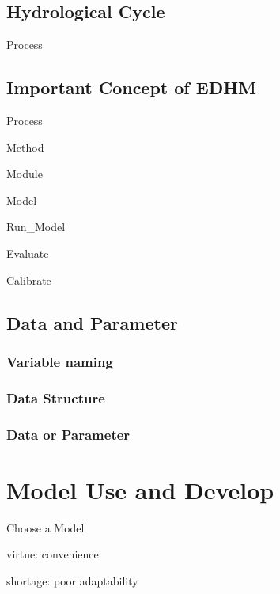 \documentclass[
]{book}
\begin{document}
\hypertarget{hydrological-cycle}{%
\section{Hydrological Cycle}\label{hydrological-cycle}}

Process

\hypertarget{important-concept-of-edhm}{%
\section{Important Concept of EDHM}\label{important-concept-of-edhm}}

Process

Method

Module

Model

Run\_Model

Evaluate

Calibrate

\hypertarget{data-and-parameter}{%
\section{Data and Parameter}\label{data-and-parameter}}

\hypertarget{variable-naming}{%
\subsection{Variable naming}\label{variable-naming}}

\hypertarget{data-structure}{%
\subsection{Data Structure}\label{data-structure}}

\hypertarget{data-or-parameter}{%
\subsection{Data or Parameter}\label{data-or-parameter}}

\hypertarget{develop}{%
\chapter{Model Use and Develop}\label{develop}}

Choose a Model

virtue: convenience

shortage: poor adaptability
\end{document}
